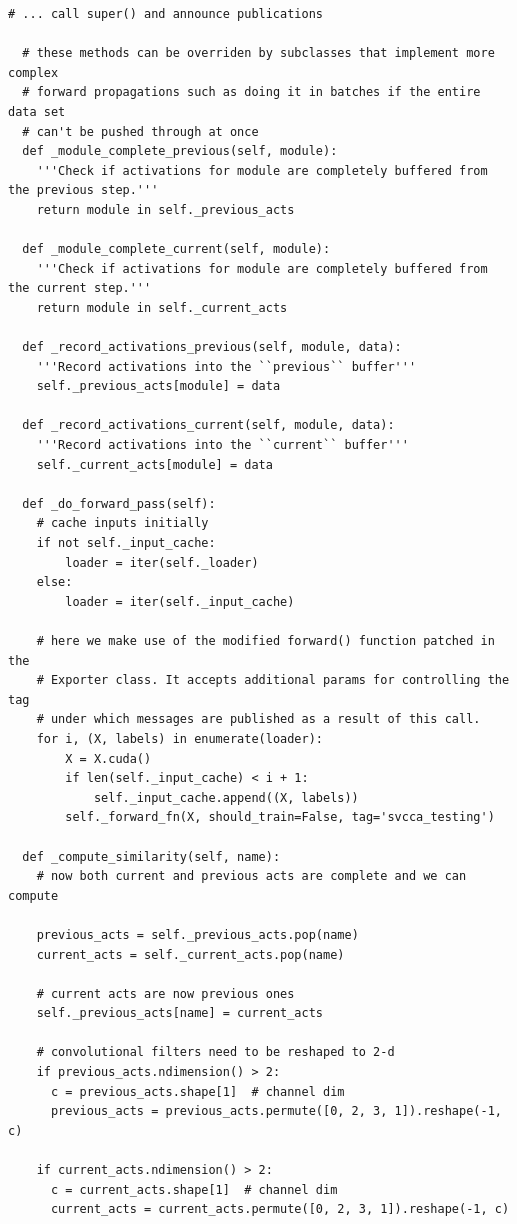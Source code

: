 \begin{lstlisting}[label={lst:svcca_sub},
caption={SVCCA Subscriber}]
    # ... call super() and announce publications

  # these methods can be overriden by subclasses that implement more complex
  # forward propagations such as doing it in batches if the entire data set
  # can't be pushed through at once
  def _module_complete_previous(self, module):
    '''Check if activations for module are completely buffered from the previous step.'''
    return module in self._previous_acts

  def _module_complete_current(self, module):
    '''Check if activations for module are completely buffered from the current step.'''
    return module in self._current_acts

  def _record_activations_previous(self, module, data):
    '''Record activations into the ``previous`` buffer'''
    self._previous_acts[module] = data

  def _record_activations_current(self, module, data):
    '''Record activations into the ``current`` buffer'''
    self._current_acts[module] = data

  def _do_forward_pass(self):
    # cache inputs initially
    if not self._input_cache:
        loader = iter(self._loader)
    else:
        loader = iter(self._input_cache)

    # here we make use of the modified forward() function patched in the
    # Exporter class. It accepts additional params for controlling the tag
    # under which messages are published as a result of this call.
    for i, (X, labels) in enumerate(loader):
        X = X.cuda()
        if len(self._input_cache) < i + 1:
            self._input_cache.append((X, labels))
        self._forward_fn(X, should_train=False, tag='svcca_testing')

  def _compute_similarity(self, name):
    # now both current and previous acts are complete and we can compute

    previous_acts = self._previous_acts.pop(name)
    current_acts = self._current_acts.pop(name)

    # current acts are now previous ones
    self._previous_acts[name] = current_acts

    # convolutional filters need to be reshaped to 2-d
    if previous_acts.ndimension() > 2:
      c = previous_acts.shape[1]  # channel dim
      previous_acts = previous_acts.permute([0, 2, 3, 1]).reshape(-1, c)

    if current_acts.ndimension() > 2:
      c = current_acts.shape[1]  # channel dim
      current_acts = current_acts.permute([0, 2, 3, 1]).reshape(-1, c)


\end{lstlisting}

